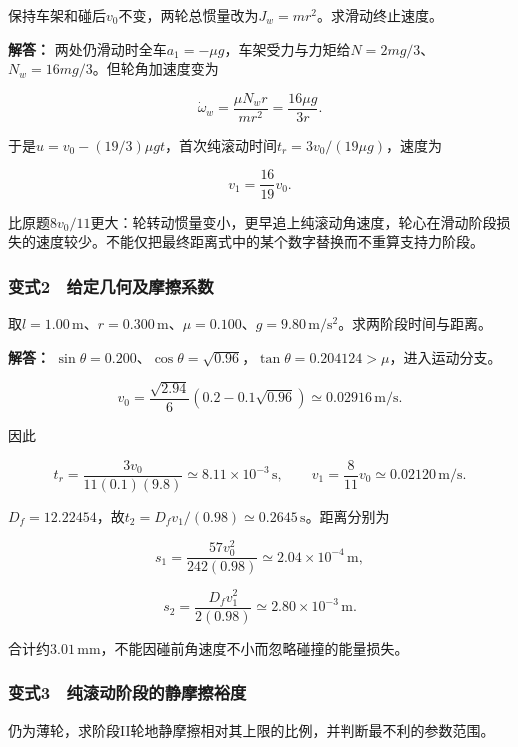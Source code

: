 \documentclass[12pt,a4paper,fontset=fandol]{ctexart}
\begin{document}
保持车架和碰后\(v_0\)不变，两轮总惯量改为\(J_w=mr^2\)。求滑动终止速度。

\textbf{解答：}
两处仍滑动时全车\(a_1=-\mu g\)，车架受力与力矩给\(N=2mg/3\)、\(N_w=16mg/3\)。但轮角加速度变为

\[
\dot\omega_w=\frac{\mu N_wr}{mr^2}
=\frac{16\mu g}{3r}.
\]

于是\(u=v_0-(19/3)\mu gt\)，首次纯滚动时间\(t_r=3v_0/(19\mu g)\)，速度为

\[
\boxed{v_1=\frac{16}{19}v_0}.
\]

比原题\(8v_0/11\)更大：轮转动惯量变小，更早追上纯滚动角速度，轮心在滑动阶段损失的速度较少。不能仅把最终距离式中的某个数字替换而不重算支持力阶段。

\subsubsection{变式2　给定几何及摩擦系数}\label{ux53d8ux5f0f2-ux7ed9ux5b9aux51e0ux4f55ux53caux6469ux64e6ux7cfbux6570}

取\(l=1.00\,\mathrm m\)、\(r=0.300\,\mathrm m\)、\(\mu=0.100\)、\(g=9.80\,\mathrm{m/s^2}\)。求两阶段时间与距离。

\textbf{解答：}
\(\sin\theta=0.200\)、\(\cos\theta=\sqrt{0.96}\)，\(\tan\theta=0.204124>\mu\)，进入运动分支。

\[
v_0=\frac{\sqrt{2.94}}6
(0.2-0.1\sqrt{0.96})\simeq0.02916\,\mathrm{m/s}.
\]

因此

\[
t_r=\frac{3v_0}{11(0.1)(9.8)}
\simeq8.11\times10^{-3}\,\mathrm s,
\qquad
v_1=\frac8{11}v_0\simeq0.02120\,\mathrm{m/s}.
\]

\(D_f=12.22454\)，故\(t_2=D_fv_1/(0.98)\simeq0.2645\,\mathrm s\)。距离分别为

\[
s_1=\frac{57v_0^2}{242(0.98)}
\simeq2.04\times10^{-4}\,\mathrm m,
\]

\[
s_2=\frac{D_fv_1^2}{2(0.98)}
\simeq2.80\times10^{-3}\,\mathrm m.
\]

合计约\(3.01\,\mathrm{mm}\)，不能因碰前角速度不小而忽略碰撞的能量损失。

\subsubsection{变式3　纯滚动阶段的静摩擦裕度}\label{ux53d8ux5f0f3-ux7eafux6edaux52a8ux9636ux6bb5ux7684ux9759ux6469ux64e6ux88d5ux5ea6}

仍为薄轮，求阶段II轮地静摩擦相对其上限的比例，并判断最不利的参数范围。
\end{document}
